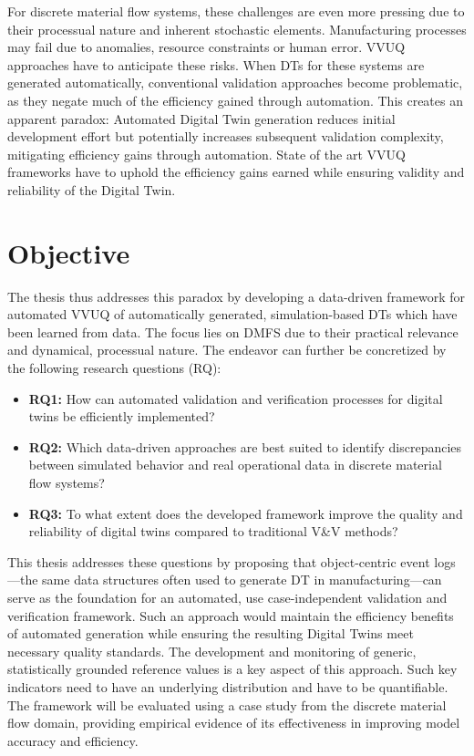 For discrete material flow systems, these challenges are even more pressing due to their processual nature and inherent stochastic elements. Manufacturing processes may fail due to anomalies, resource constraints or human error. VVUQ approaches have to anticipate these risks. When DTs for these systems are generated automatically, conventional validation approaches become problematic, as they negate much of the efficiency gained through automation. This creates an apparent paradox: Automated Digital Twin generation reduces initial development effort but potentially increases subsequent validation complexity, mitigating efficiency gains through automation. State of the art VVUQ frameworks have to uphold the efficiency gains earned while ensuring validity and reliability of the Digital Twin.

\section{Objective}

The thesis thus addresses this paradox by developing a data-driven framework for automated VVUQ of automatically generated, simulation-based DTs which have been learned from data. The focus lies on DMFS due to their practical relevance and dynamical, processual nature. The endeavor can further be concretized by the following research questions (RQ):

\begin{itemize}
  \item \textbf{RQ1:} How can automated validation and verification processes for digital twins be efficiently implemented?
  \item \textbf{RQ2:} Which data-driven approaches are best suited to identify discrepancies between simulated behavior and real operational data in discrete material flow systems?
  \item \textbf{RQ3:} To what extent does the developed framework improve the quality and reliability of digital twins compared to traditional V&V methods?
\end{itemize}

This thesis addresses these questions by proposing that object-centric event logs—the same data structures often used to generate DT in manufacturing—can serve as the foundation for an automated, use case-independent validation and verification framework. Such an approach would maintain the efficiency benefits of automated generation while ensuring the resulting Digital Twins meet necessary quality standards. The development and monitoring of generic, statistically grounded reference values is a key aspect of this approach. Such key indicators need to have an underlying distribution and have to be quantifiable. The framework will be evaluated using a case study from the discrete material flow domain, providing empirical evidence of its effectiveness in improving model accuracy and efficiency.

